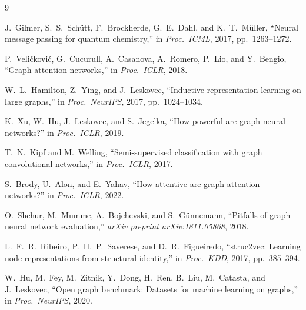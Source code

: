 \documentclass[conference]{IEEEtran}
\begin{document}
\begin{thebibliography}{9}

J.\ Gilmer, S.\ S.\ Sch\"{u}tt, F.\ Brockherde, G.\ E.\ Dahl, and K.\ T.\ M\"{u}ller,
``Neural message passing for quantum chemistry,''
in \textit{Proc.\ ICML}, 2017, pp.\ 1263--1272.

P.\ Veli\v{c}kovi\'{c}, G.\ Cucurull, A.\ Casanova, A.\ Romero, P.\ Lio, and Y.\ Bengio,
``Graph attention networks,''
in \textit{Proc.\ ICLR}, 2018.

W.\ L.\ Hamilton, Z.\ Ying, and J.\ Leskovec,
``Inductive representation learning on large graphs,''
in \textit{Proc.\ NeurIPS}, 2017, pp.\ 1024--1034.

K.\ Xu, W.\ Hu, J.\ Leskovec, and S.\ Jegelka,
``How powerful are graph neural networks?''
in \textit{Proc.\ ICLR}, 2019.

T.\ N.\ Kipf and M.\ Welling,
``Semi-supervised classification with graph convolutional networks,''
in \textit{Proc.\ ICLR}, 2017.

S.\ Brody, U.\ Alon, and E.\ Yahav,
``How attentive are graph attention networks?''
in \textit{Proc.\ ICLR}, 2022.

O.\ Shchur, M.\ Mumme, A.\ Bojchevski, and S.\ G\"{u}nnemann,
``Pitfalls of graph neural network evaluation,''
\textit{arXiv preprint arXiv:1811.05868}, 2018.

L.\ F.\ R.\ Ribeiro, P.\ H.\ P.\ Saverese, and D.\ R.\ Figueiredo,
``struc2vec: Learning node representations from structural identity,''
in \textit{Proc.\ KDD}, 2017, pp.\ 385--394.

W.\ Hu, M.\ Fey, M.\ Zitnik, Y.\ Dong, H.\ Ren, B.\ Liu, M.\ Catasta, and J.\ Leskovec,
``Open graph benchmark: Datasets for machine learning on graphs,''
in \textit{Proc.\ NeurIPS}, 2020.

\end{thebibliography}
\end{document}
